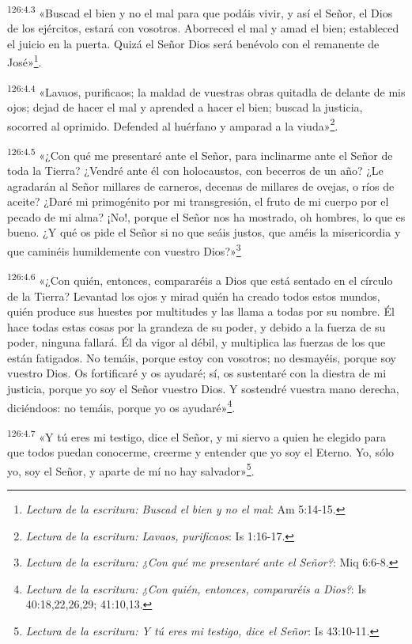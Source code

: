 \par 
\textsuperscript{126:4.3} «Buscad el bien y no el mal para que podáis vivir, y así el Señor, el Dios de los ejércitos, estará con vosotros. Aborreced el mal y amad el bien; estableced el juicio en la puerta. Quizá el Señor Dios será benévolo con el remanente de José»\footnote{\textit{Lectura de la escritura: Buscad el bien y no el mal}: Am 5:14-15.}.

\par 
\textsuperscript{126:4.4} «Lavaos, purificaos; la maldad de vuestras obras quitadla de delante de mis ojos; dejad de hacer el mal y aprended a hacer el bien; buscad la justicia, socorred al oprimido. Defended al huérfano y amparad a la viuda»\footnote{\textit{Lectura de la escritura: Lavaos, purificaos}: Is 1:16-17.}.

\par 
\textsuperscript{126:4.5} «¿Con qué me presentaré ante el Señor, para inclinarme ante el Señor de toda la Tierra? ¿Vendré ante él con holocaustos, con becerros de un año? ¿Le agradarán al Señor millares de carneros, decenas de millares de ovejas, o ríos de aceite? ¿Daré mi primogénito por mi transgresión, el fruto de mi cuerpo por el pecado de mi alma? ¡No!, porque el Señor nos ha mostrado, oh hombres, lo que es bueno. ¿Y qué os pide el Señor si no que seáis justos, que améis la misericordia y que caminéis humildemente con vuestro Dios?»\footnote{\textit{Lectura de la escritura: ¿Con qué me presentaré ante el Señor?}: Miq 6:6-8.}

\par 
\textsuperscript{126:4.6} «¿Con quién, entonces, compararéis a Dios que está sentado en el círculo de la Tierra? Levantad los ojos y mirad quién ha creado todos estos mundos, quién produce sus huestes por multitudes y las llama a todas por su nombre. Él hace todas estas cosas por la grandeza de su poder, y debido a la fuerza de su poder, ninguna fallará. Él da vigor al débil, y multiplica las fuerzas de los que están fatigados. No temáis, porque estoy con vosotros; no desmayéis, porque soy vuestro Dios. Os fortificaré y os ayudaré; sí, os sustentaré con la diestra de mi justicia, porque yo soy el Señor vuestro Dios. Y sostendré vuestra mano derecha, diciéndoos: no temáis, porque yo os ayudaré»\footnote{\textit{Lectura de la escritura: ¿Con quién, entonces, compararéis a Dios?}: Is 40:18,22,26,29; 41:10,13.}.

\par 
\textsuperscript{126:4.7} «Y tú eres mi testigo, dice el Señor, y mi siervo a quien he elegido para que todos puedan conocerme, creerme y entender que yo soy el Eterno. Yo, sólo yo, soy el Señor, y aparte de mí no hay salvador»\footnote{\textit{Lectura de la escritura: Y tú eres mi testigo, dice el Señor}: Is 43:10-11.}.

